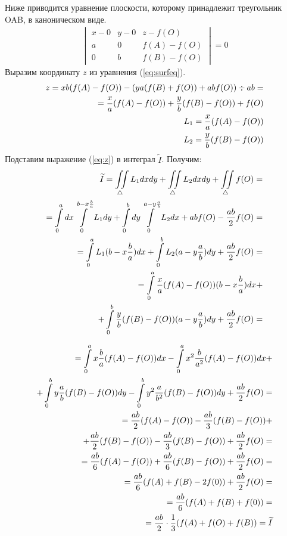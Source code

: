 \documentclass{article}
\begin{document}
\begin{enumerate}
Ниже приводится уравнение плоскости, которому принадлежит треугольник OAB, в каноническом виде.
\begin{align}
\begin{vmatrix}\label{eq:surfeq}
  x-0	& y-0	& z-f(O)	\\
  a		& 0		& f(A)-f(O)	\\
  0		& b		& f(B)-f(O)
\end{vmatrix}
= 0
\end{align}
Выразим координату $z$ из уравнения (\ref{eq:surfeq}).
\begin{align}
z = xb(f(A)-f(O))-(ya(f(B)+f(O))+abf(O)) \div ab = \notag \\
= \frac{x}{a}(f(A)-f(O))+\frac{y}{b}(f(B)-f(O)) + f(O) \label{eq:z} \\
L_1 = \frac{x}{a}(f(A)-f(O)) \\
L_2 = \frac{y}{b}(f(B)-f(O))
\end{align}
Подставим выражение (\ref{eq:z}) в интеграл $\widetilde{I}$. Получим:
\begin{align}
\widetilde{I} = \iint\limits_{\triangle} L_1 dx dy+\iint\limits_{\triangle} L_2 dx dy+\iint\limits_{\triangle} f(O)= \notag \\
= \int\limits_0^a dx \int\limits_0^{b-x \frac{b}{a}} L_1 dy + \int\limits_0^b dy \int\limits_0^{a-y \frac{a}{b}} L_2 dx + ab f(O)- \frac{ab}{2}f(O) = \notag \\
= \int\limits_0^a L_1 (b-x \frac{b}{a}) dx + \int\limits_0^b L_2 (a-y \frac{a}{b}) dy + \frac{ab}{2} f(O) = \notag \\
= \int\limits_0^a \frac{x}{a} (f(A)-f(O)) (b-x \frac{b}{a}) dx + \notag \\
+ \int\limits_0^b \frac{y}{b} (f(B)-f(O)) (a-y \frac{a}{b}) dy + \frac{ab}{2} f(O) = \notag
\end{align}

\begin{align}
= \int\limits_0^a x \frac{b}{a} (f(A)-f(O)) dx - \int\limits_0^a x^2 \frac{b}{a^2} (f(A)-f(O)) dx + \notag \\
+ \int\limits_0^b y \frac{a}{b} (f(B)-f(O)) dy - \int\limits_0^b y^2 \frac{a}{b^2}(f(B)-f(O))dy + \frac{ab}{2} f(O) = \notag \\
= \frac{ab}{2} (f(A)-f(O)) - \frac{ab}{3} (f(B)-f(O)) + \notag \\
+ \frac{ab}{2}(f(B)-f(O)) - \frac{ab}{3} (f(B)-f(O)) + \frac{ab}{2} f(O) = \notag \\
= \frac{ab}{6} (f(A)-f(O)) + \frac{ab}{6} (f(B)-f(O)) + \frac{ab}{2} f(O) = \notag \\
= \frac{ab}{6} (f(A)+f(B)-2f(0)) + \frac{ab}{2} f(O) = \notag\\
= \frac{ab}{6} (f(A)+f(B)+f(0)) = \notag \\
= \frac{ab}{2} \cdot \frac{1}{3}(f(A)+f(O)+f(B)) = \widetilde{I}\label{eq:trifunc}
\end{align}


\end{enumerate}
\end{document}
